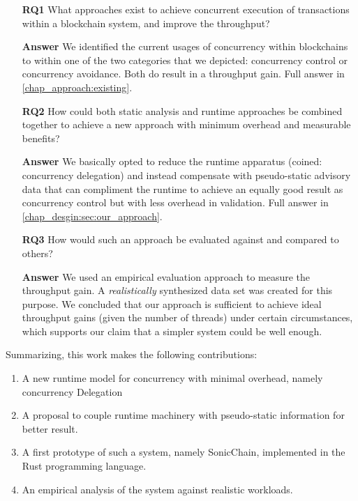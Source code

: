 \begin{enumerate}
	\item [\textbf{RQ1}] What approaches exist to achieve concurrent execution of transactions
	within a blockchain system, and improve the throughput?

	\item [\textbf{Answer}] We identified the current usages of concurrency within blockchains to
	within one of the two categories that we depicted: concurrency control or concurrency avoidance.
	Both do result in a throughput gain. Full answer in \ref{chap_approach:existing}.

	\item [\textbf{RQ2}] How could both static analysis and runtime approaches be combined together
	to achieve a new approach with minimum overhead and measurable benefits?

	\item [\textbf{Answer}] We basically opted to reduce the runtime apparatus (coined: concurrency
	delegation) and instead compensate with pseudo-static advisory data that can compliment the
	runtime to achieve an equally good result as concurrency control but with less overhead in validation. Full answer in \ref{chap_desgin:sec:our_approach}.

	\item [\textbf{RQ3}] How would such an approach be evaluated against and compared to others?

	\item [\textbf{Answer}] We used an empirical evaluation approach to measure the throughput gain. A \textit{realistically} synthesized data set was created for this purpose. We concluded that our approach is sufficient to achieve ideal throughput
	gains (given the number of threads) under certain circumstances, which supports our claim that a
	simpler system could be well enough.
\end{enumerate}

Summarizing, this work makes the following contributions:
\begin{enumerate}
    \item A new runtime model for concurrency with minimal overhead, namely concurrency Delegation
    \item A proposal to couple runtime machinery with pseudo-static information for better result. 
    \item A first prototype of such a system, namely SonicChain, implemented in the Rust programming language. 
    \item An empirical analysis of the system against realistic workloads.
\end{enumerate}

